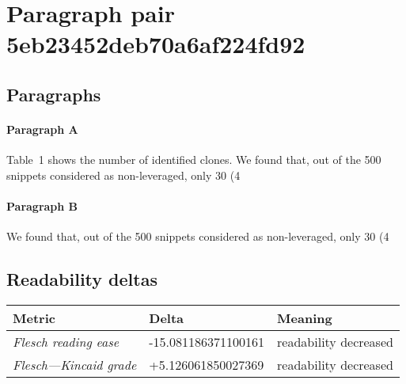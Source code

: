 \section{Paragraph pair 5eb23452deb70a6af224fd92}
\subsection{Paragraphs}
\paragraph{Paragraph A}
Table 1 shows the number of identified clones. We found that, out of the 500 snippets considered as non-leveraged, only 30 (4%

\paragraph{Paragraph B}
We found that, out of the 500 snippets considered as non-leveraged, only 30 (4%

\subsection{Readability deltas}

\begin{tabular}{lll}
\toprule
               \textbf{Metric} &       \textbf{Delta} &       \textbf{Meaning} \\
\midrule
    \emph{Flesch reading ease} &  -15.081186371100161 &  readability decreased \\
 \emph{Flesch---Kincaid grade} &   +5.126061850027369 &  readability decreased \\
\bottomrule
\end{tabular}

